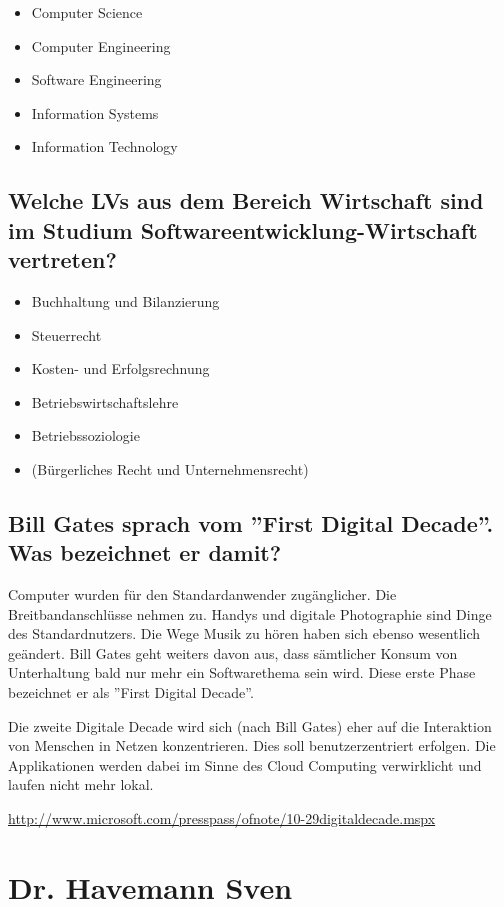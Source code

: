 \begin{itemize}
  \item Computer Science
  \item Computer Engineering
  \item Software Engineering
  \item Information Systems
  \item Information Technology
\end{itemize}

\subsection{Welche LVs aus dem Bereich Wirtschaft sind im Studium
    Softwareentwicklung-Wirtschaft vertreten?}

\begin{itemize}
  \item Buchhaltung und Bilanzierung
  \item Steuerrecht
  \item Kosten- und Erfolgsrechnung
  \item Betriebswirtschaftslehre
  \item Betriebssoziologie
  \item (Bürgerliches Recht und Unternehmensrecht)
\end{itemize}

\subsection{Bill Gates sprach vom ''First Digital Decade''. Was bezeichnet
    er damit?}

Computer wurden für den Standardanwender zugänglicher. Die
Breitbandanschlüsse nehmen zu. Handys und digitale Photographie
sind Dinge des Standardnutzers. Die Wege Musik zu hören haben
sich ebenso wesentlich geändert. Bill Gates geht weiters davon
aus, dass sämtlicher Konsum von Unterhaltung bald nur mehr ein
Softwarethema sein wird. Diese erste Phase bezeichnet er als
''First Digital Decade''.

Die zweite Digitale Decade wird sich (nach Bill Gates) eher auf
die Interaktion von Menschen in Netzen konzentrieren. Dies soll
benutzerzentriert erfolgen. Die Applikationen werden dabei im
Sinne des Cloud Computing verwirklicht und laufen nicht mehr lokal.

\url{http://www.microsoft.com/presspass/ofnote/10-29digitaldecade.mspx}

\section{Dr. Havemann Sven}

